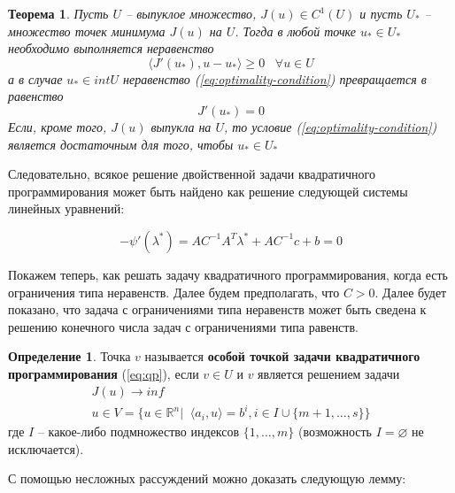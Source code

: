 \documentclass[a4paper, 12pt, titlepage]{article}
\theoremstyle{definition}
\newtheorem{SmartDefinition}{Определение}
\theoremstyle{plain}
\newtheorem{SmartTheorem}{Теорема}
\theoremstyle{plain}
\begin{document}
\begin{SmartTheorem}
 Пусть $U$ -- выпуклое множество, $J(u) \in C^{1}(U)$ и пусть $U_{*}$ --
 множество точек минимума $J(u)$ на $U$. Тогда в любой точке $u_{*} \in U_{*}$
 необходимо выполняется неравенство
 \begin{equation}
 \label{eq:optimality-condition}
  \langle J'(u_{*}), u - u_{*} \rangle \geq 0 \;\;\; \forall u \in U
 \end{equation}
 а в случае $u_{*} \in int U$ неравенство (\ref{eq:optimality-condition})
 превращается в равенство
 \begin{equation}
  J'(u_{*}) = 0
 \end{equation}
 Если, кроме того, $J(u)$ выпукла на $U$, то условие
 (\ref{eq:optimality-condition}) является достаточным для того, чтобы
 $u_{*} \in U_{*}$
\end{SmartTheorem}

Следовательно, всякое решение двойственной задачи квадратичного программирования
может быть найдено как решение следующей системы линейных уравнений:

\begin{equation}
 - \psi'(\lambda^{*}) = A C^{-1} A^{T} \lambda^{*} + A C^{-1} c + b = 0
\end{equation}

Покажем теперь, как решать задачу квадратичного программирования, когда есть
ограничения типа неравенств. Далее будем предполагать, что $C > 0$. Далее будет
показано, что задача с ограничениями типа неравенств может быть сведена к 
решению конечного числа задач с ограничениями типа равенств.

\begin{SmartDefinition}
 Точка $v$ называется \textbf{особой точкой задачи квадратичного 
 программирования} (\ref{eq:qp}), если $v \in U$ и $v$ является решением задачи
 \begin{equation}
 \label{eq:spec-point}
  \begin{aligned}
    J(u) \to inf \\
    u \in V = \{u \in \mathbb{R}^{n} | \;\; \langle a_{i}, u \rangle = b^{i},
    i \in I \cup \{m + 1, \ldots, s\}\}
  \end{aligned}
 \end{equation}
 где $I$ -- какое-либо подмножество индексов $\{1, \ldots, m\}$ (возможность
 $I = \varnothing$ не исключается).
\end{SmartDefinition}

С помощью несложных рассуждений можно доказать следующую лемму:
\end{document}
